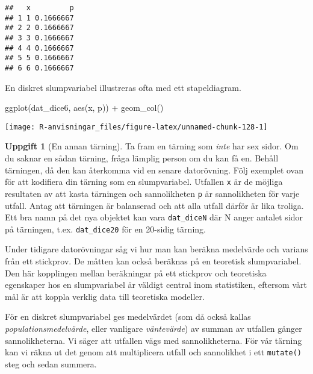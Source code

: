 \documentclass[
]{book}
\newenvironment{Shaded}{\begin{snugshade}}{\end{snugshade}}
\newcommand{\FunctionTok}[1]{\textcolor[rgb]{0.00,0.00,0.00}{#1}}
\newcommand{\NormalTok}[1]{#1}
\newcommand{\SpecialCharTok}[1]{\textcolor[rgb]{0.00,0.00,0.00}{#1}}
\theoremstyle{definition}
\theoremstyle{definition}
\theoremstyle{definition}
\newtheorem{exercise}{Uppgift}[chapter]
\theoremstyle{definition}
\theoremstyle{remark}
\begin{document}
\begin{verbatim}
##   x         p
## 1 1 0.1666667
## 2 2 0.1666667
## 3 3 0.1666667
## 4 4 0.1666667
## 5 5 0.1666667
## 6 6 0.1666667
\end{verbatim}

En diskret slumpvariabel illustreras ofta med ett stapeldiagram.

\begin{Shaded}
\begin{Highlighting}[]
\FunctionTok{ggplot}\NormalTok{(dat\_dice6, }\FunctionTok{aes}\NormalTok{(x, p)) }\SpecialCharTok{+} \FunctionTok{geom\_col}\NormalTok{()}
\end{Highlighting}
\end{Shaded}

\begin{center}\texttt{[image: R-anvisningar\_files/figure-latex/unnamed-chunk-128-1]} \end{center}

\begin{exercise}[En annan tärning]
Ta fram en tärning som \emph{inte} har sex sidor. Om du saknar en sådan tärning, fråga lämplig person om du kan få en. Behåll tärningen, då den kan återkomma vid en senare datorövning. Följ exemplet ovan för att kodifiera din tärning som en slumpvariabel. Utfallen \texttt{x} är de möjliga resultaten av att kasta tärningen och sannolikheten \texttt{p} är sannolikheten för varje utfall. Antag att tärningen är balanserad och att alla utfall därför är lika troliga. Ett bra namn på det nya objektet kan vara \texttt{dat\_diceN} där N anger antalet sidor på tärningen, t.ex. \texttt{dat\_dice20} för en 20-sidig tärning.
\end{exercise}

Under tidigare datorövningar såg vi hur man kan beräkna medelvärde och varians från ett stickprov. De måtten kan också beräknas på en teoretisk slumpvariabel. Den här kopplingen mellan beräkningar på ett stickprov och teoretiska egenskaper hos en slumpvariabel är väldigt central inom statistiken, eftersom vårt mål är att koppla verklig data till teoretiska modeller.

För en diskret slumpvariabel ges medelvärdet (som då också kallas \emph{populationsmedelvärde}, eller vanligare \emph{väntevärde}) av summan av utfallen gånger sannolikheterna. Vi säger att utfallen vägs med sannolikheterna. För vår tärning kan vi räkna ut det genom att multiplicera utfall och sannolikhet i ett \texttt{mutate()} steg och sedan summera.
\end{document}

